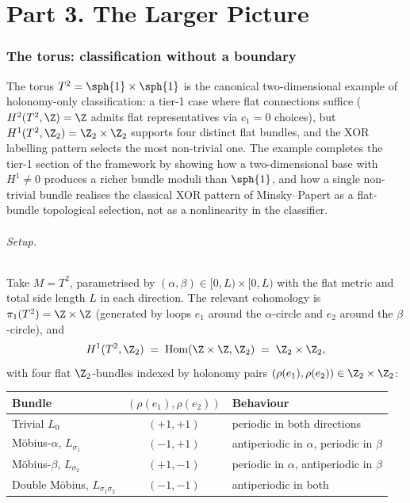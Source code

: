\part*{Part 3. The Larger Picture}

\section{The torus: classification without a boundary}
\label{sec:torus}

The torus $T^2=\sph{1}\times\sph{1}$ is the canonical
two-dimensional example of holonomy-only classification: a tier-1
case where flat connections suffice ($H^2(T^2,\Z)=\Z$ admits flat
representatives via $c_1=0$ choices), but $H^1(T^2,\Z_2)=\Z_2\times\Z_2$
supports four distinct flat bundles, and the XOR labelling pattern
selects the most non-trivial one. The example completes the tier-1
section of the framework by showing how a two-dimensional base with
$H^1\neq 0$ produces a richer bundle moduli than $\sph{1}$, and how a
single non-trivial bundle realises the classical XOR pattern of
Minsky--Papert as a flat-bundle topological selection, not as a
nonlinearity in the classifier.

\paragraph{Setup.} Take $M=T^2$, parametrised by
$(\alpha,\beta)\in[0,L)\times[0,L)$ with the flat metric and total
side length $L$ in each direction. The relevant cohomology is
$\pi_1(T^2)=\Z\times\Z$ (generated by loops $e_1$ around the
$\alpha$-circle and $e_2$ around the $\beta$-circle), and
\[
   H^1(T^2,\Z_2) \;=\; \operatorname{Hom}(\Z\times\Z,\Z_2) \;=\; \Z_2\times\Z_2,
\]
with four flat $\Z_2$-bundles indexed by holonomy pairs
$(\rho(e_1),\rho(e_2))\in\Z_2\times\Z_2$:

\begin{center}
\renewcommand{\arraystretch}{1.2}
\begin{tabular}{lcl}
\toprule
\textbf{Bundle} & \textbf{$(\rho(e_1),\rho(e_2))$} & \textbf{Behaviour} \\
\midrule
Trivial $L_0$ & $(+1,+1)$ & periodic in both directions \\
M\"obius-$\alpha$, $L_{\sigma_1}$ & $(-1,+1)$ & antiperiodic in $\alpha$, periodic in $\beta$ \\
M\"obius-$\beta$, $L_{\sigma_2}$ & $(+1,-1)$ & periodic in $\alpha$, antiperiodic in $\beta$ \\
Double M\"obius, $L_{\sigma_1\sigma_2}$ & $(-1,-1)$ & antiperiodic in both \\
\bottomrule
\end{tabular}
\end{center}


